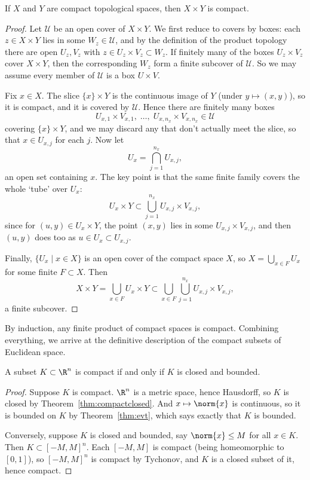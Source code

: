\begin{theorem}\label{thm:tychonov}
    If $X$ and $Y$ are compact topological spaces, then $X \times Y$ is compact.
\end{theorem}
\begin{proof}
    Let $\mathcal{U}$ be an open cover of $X \times Y$. We first reduce to covers by boxes: each $z \in X \times Y$ lies in some $W_z \in \mathcal{U}$, and by the definition of the product topology there are open $U_z, V_z$ with $z \in U_z \times V_z \subset W_z$. If finitely many of the boxes $U_z \times V_z$ cover $X \times Y$, then the corresponding $W_z$ form a finite subcover of $\mathcal{U}$. So we may assume every member of $\mathcal{U}$ is a box $U \times V$.

    Fix $x \in X$. The slice $\{x\} \times Y$ is the continuous image of $Y$ (under $y \mapsto (x, y)$), so it is compact, and it is covered by $\mathcal{U}$. Hence there are finitely many boxes
    $$
    U_{x, 1} \times V_{x, 1}, \; \dots, \; U_{x, n_x} \times V_{x, n_x} \in \mathcal{U}
    $$
    covering $\{x\} \times Y$, and we may discard any that don't actually meet the slice, so that $x \in U_{x, j}$ for each $j$. Now let
    $$
    U_x = \bigcap_{j = 1}^{n_x} U_{x, j},
    $$
    an open set containing $x$. The key point is that the same finite family covers the whole `tube' over $U_x$:
    $$
    U_x \times Y \subset \bigcup_{j = 1}^{n_x} U_{x, j} \times V_{x, j},
    $$
    since for $(u, y) \in U_x \times Y$, the point $(x, y)$ lies in some $U_{x, j} \times V_{x, j}$, and then $(u, y)$ does too as $u \in U_x \subset U_{x,j}$.

    Finally, $\{U_x \mid x \in X\}$ is an open cover of the compact space $X$, so $X = \bigcup_{x \in F} U_x$ for some finite $F \subset X$. Then
    $$
    X \times Y = \bigcup_{x \in F} U_x \times Y \subset \bigcup_{x \in F} \bigcup_{j = 1}^{n_x} U_{x, j} \times V_{x, j},
    $$
    a finite subcover.
\end{proof}

By induction, any finite product of compact spaces is compact. Combining everything, we arrive at the definitive description of the compact subsets of Euclidean space.

\begin{theorem}
    A subset $K \subset \R^n$ is compact if and only if $K$ is closed and bounded.
\end{theorem}
\begin{proof}
    Suppose $K$ is compact. $\R^n$ is a metric space, hence Hausdorff, so $K$ is closed by Theorem~\ref{thm:compactclosed}. And $x \mapsto \norm{x}$ is continuous, so it is bounded on $K$ by Theorem~\ref{thm:evt}, which says exactly that $K$ is bounded.

    Conversely, suppose $K$ is closed and bounded, say $\norm{x} \leq M$ for all $x \in K$. Then $K \subset [-M, M]^n$. Each $[-M, M]$ is compact (being homeomorphic to $[0, 1]$), so $[-M, M]^n$ is compact by Tychonov, and $K$ is a closed subset of it, hence compact.
\end{proof}

